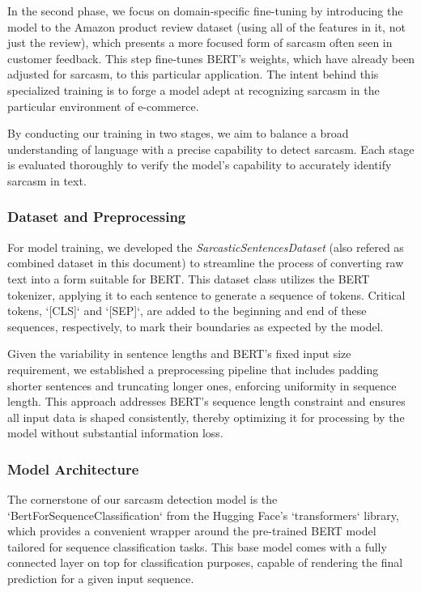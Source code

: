 \documentclass[10pt,twocolumn,letterpaper]{article}
\begin{document}
In the second phase, we focus on domain-specific fine-tuning by introducing the model to the Amazon product review dataset (using all of the features in it, not just the review), which presents a more focused form of sarcasm often seen in customer feedback. This step fine-tunes BERT's weights, which have already been adjusted for sarcasm, to this particular application. The intent behind this specialized training is to forge a model adept at recognizing sarcasm in the particular environment of e-commerce.

By conducting our training in two stages, we aim to balance a broad understanding of language with a precise capability to detect sarcasm. Each stage is evaluated thoroughly to verify the model’s capability to accurately identify sarcasm in text.  
\subsubsection{Dataset and Preprocessing}
For model training, we developed the \textit{SarcasticSentencesDataset} (also refered as combined dataset in this document) to streamline the process of converting raw text into a form suitable for BERT. This dataset class utilizes the BERT tokenizer, applying it to each sentence to generate a sequence of tokens. Critical tokens, `[CLS]` and `[SEP]`, are added to the beginning and end of these sequences, respectively, to mark their boundaries as expected by the model.

Given the variability in sentence lengths and BERT's fixed input size requirement, we established a preprocessing pipeline that includes padding shorter sentences and truncating longer ones, enforcing uniformity in sequence length. This approach addresses BERT's sequence length constraint and ensures all input data is shaped consistently, thereby optimizing it for processing by the model without substantial information loss.

\subsubsection{Model Architecture}
The cornerstone of our sarcasm detection model is the `BertForSequenceClassification` from the Hugging Face's `transformers` library, which provides a convenient wrapper around the pre-trained BERT model tailored for sequence classification tasks. This base model comes with a fully connected layer on top for classification purposes, capable of rendering the final prediction for a given input sequence.
\end{document}
